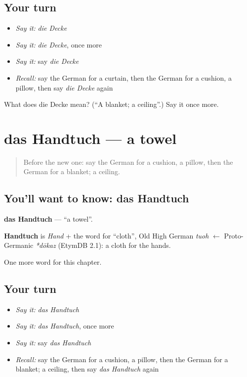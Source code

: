 \subsection*{Your turn}
\begin{itemize}
\raggedright
  \item \emph{Say it:} \emph{die Decke}
  \item \emph{Say it:} \emph{die Decke}, once more
  \item \emph{Say it:} say \emph{die Decke}
  \item \emph{Recall:} say the German for a curtain, then the German for a cushion, a pillow, then say \emph{die Decke} again
\end{itemize}

\begin{tcolorbox}[breakable,colback=teal!4,colframe=teal!35!black,title={Before you move on}]
What does die Decke mean? (\textquotedblleft{}A blanket; a ceiling\textquotedblright{}.) Say it once more.
\end{tcolorbox}
\section[das Handtuch]{das Handtuch — a towel}

\label{lesson:GE-C114-handtuch}



\begin{quote}
Before the new one: say the German for a cushion, a pillow, then the German for a blanket; a ceiling.
\end{quote}

\subsection*{You'll want to know: das Handtuch}
\textbf{das Handtuch} — \textquotedblleft{}a towel\textquotedblright{}.

\begin{cousinweb}
\textbf{Handtuch} is \emph{Hand} + the word for \textquotedblleft{}cloth\textquotedblright{}, Old High German \emph{tuoh} $\leftarrow$ Proto-Germanic \emph{*dōkaz} (EtymDB 2.1): a cloth for the hands.
\end{cousinweb}

\begin{grammarlens}[title={What you've built}]
One more word for this chapter.
\end{grammarlens}

\subsection*{Your turn}
\begin{itemize}
\raggedright
  \item \emph{Say it:} \emph{das Handtuch}
  \item \emph{Say it:} \emph{das Handtuch}, once more
  \item \emph{Say it:} say \emph{das Handtuch}
  \item \emph{Recall:} say the German for a cushion, a pillow, then the German for a blanket; a ceiling, then say \emph{das Handtuch} again
\end{itemize}

